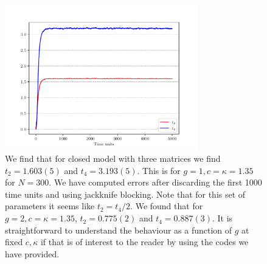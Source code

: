 \documentclass[letter,11pt]{article}
\begin{document}
\begin{figure}[htbp] 
	\centering 
	\includegraphics[width=0.75\textwidth]{figs/3MM_closed.pdf}
	\caption{\label{fig:3MM_closed}We find that for closed model with three matrices we find $t_{2} = 1.603(5)$ and $t_{4} = 3.193(5)$. 
		This is for $g=1, c=\kappa=1.35$ for $N=300$. We have computed errors after discarding the first 1000 time units and 
		using jackknife blocking. Note that for this set of parameters it seems like $t_{2} = t_{4}/2$. We found that 
		for $g=2, c=\kappa=1.35$, $t_{2} = 0.775(2)$ and $t_{4} = 0.887(3)$. It is straightforward to understand the behaviour as a function of $g$ at fixed $c, \kappa$ if that is of interest to the reader by using the codes we have provided.}
\end{figure}
\end{document}
